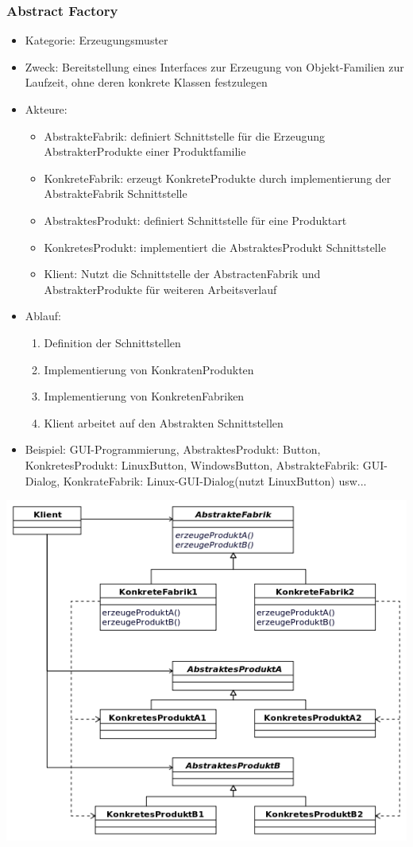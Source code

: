 \documentclass[11pt, fleqn, a4paper, leqno]{scrartcl} %
\begin{document}
		\subsubsection{Abstract Factory}
			\begin{itemize}
				\item Kategorie: Erzeugungsmuster
				\item Zweck: Bereitstellung eines Interfaces zur Erzeugung von Objekt-Familien zur Laufzeit, ohne deren konkrete Klassen festzulegen
				\item Akteure: 
					\begin{itemize}
						\item AbstrakteFabrik: definiert Schnittstelle für die Erzeugung AbstrakterProdukte einer Produktfamilie
						\item KonkreteFabrik: erzeugt KonkreteProdukte durch implementierung der AbstrakteFabrik Schnittstelle
						\item AbstraktesProdukt: definiert Schnittstelle für eine Produktart
						\item KonkretesProdukt: implementiert die AbstraktesProdukt Schnittstelle
						\item Klient: Nutzt die Schnittstelle der AbstractenFabrik und AbstrakterProdukte für weiteren Arbeitsverlauf 
					\end{itemize}
				\item Ablauf:
					\begin{enumerate}
						\item Definition der Schnittstellen
						\item Implementierung von KonkratenProdukten
						\item Implementierung von KonkretenFabriken
						\item Klient arbeitet auf den Abstrakten Schnittstellen 
					\end{enumerate}
				\item Beispiel: GUI-Programmierung, AbstraktesProdukt: Button, KonkretesProdukt: LinuxButton, WindowsButton, AbstrakteFabrik: GUI-Dialog, KonkrateFabrik: Linux-GUI-Dialog(nutzt LinuxButton) usw...
			\end{itemize}
			\includegraphics[scale=0.5]{images/abstract-factory.png}
			\newpage
\end{document}
